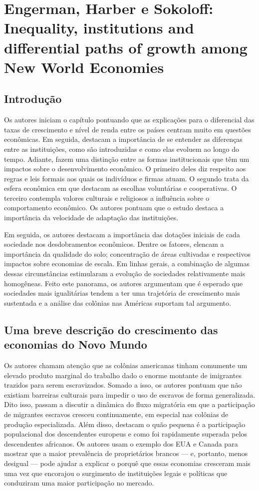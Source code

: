\section*{Engerman, Harber e Sokoloff: Inequality, institutions and differential paths of growth among New World Economies}

\subsection*{Introdução}

Os autores iniciam o capítulo pontuando que as explicações para o diferencial das taxas de crescimento e nível de renda entre os países centram muito em questões econômicas. Em seguida, destacam a importância de se entender as diferenças entre as instituições, como são introduzidas e como elas evoluem ao longo do tempo. Adiante, fazem uma distinção entre as formas institucionais que têm um impactos sobre o desenvolvimento econômico. O primeiro deles diz respeito aos regras e leis formais aos quais os indivíduos e firmas atuam. O segundo trata da esfera econômica em que destacam as escolhas voluntárias e cooperativas. O terceiro contempla valores culturais e religiosos a influência sobre o comportamento econômico. Os autores pontuam que o estudo destaca a importância da velocidade de adaptação das instituições.

 Em seguida, os autores destacam a importância das dotações iniciais de cada sociedade nos desdobramentos econômicos. Dentre os fatores, elencam a importância da qualidade do solo; concentração de áreas cultivadas e respectivos impactos sobre economias de escala. Em linhas gerais, a combinação de algumas dessas circunstâncias estimularam a evolução de sociedades relativamente mais homogêneas. Feito este panorama, os autores argumentam que é esperado que sociedades mais igualitárias tendem a ter uma trajetória de crescimento mais sustentada e a análise das colônias nas Américas suportam tal argumento.
 
 \subsection*{Uma breve descrição do crescimento das economias do Novo Mundo}
 
 Os autores chamam atenção que as colônias americanas tinham comumente um elevado produto marginal do trabalho dado o enorme montante de imigrantes trazidos para serem escravizados. Somado a isso, os autores pontuam que não existiam barreiras culturais para impedir o uso de escravos de forma generalizada. Dito isso, passam a discutir a dinâmica do fluxo migratória em que a participação de migrantes escravos cresceu continuamente, em especial nas colônias de produção especializada. Além disso, destacam o quão pequena é a participação populacional dos descendentes europeus e como foi rapidamente superada pelos descendentes africanos. Os autores usam o exemplo dos EUA e Canada para mostrar que a maior prevalência de proprietários brancos --- e, portanto, menos desigual --- pode ajudar a explicar o porquê que essas economias cresceram mais uma vez que encorajou o surgimento de instituições legais e políticas que conduziram uma maior participação no mercado.
 
